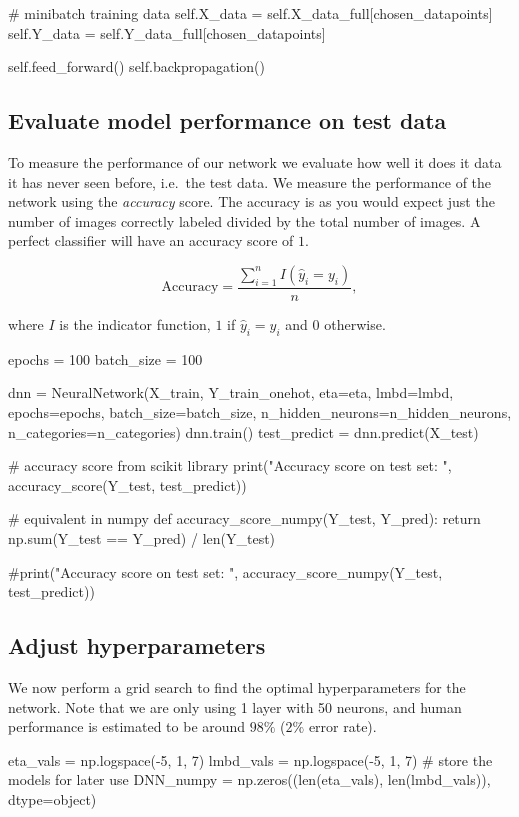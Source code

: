 \documentclass[%
oneside,                 %
final,                   %
10pt]{article}
\begin{document}
                # minibatch training data
                self.X_data = self.X_data_full[chosen_datapoints]
                self.Y_data = self.Y_data_full[chosen_datapoints]

                self.feed_forward()
                self.backpropagation()
\epycod

\subsection{Evaluate model performance on test data}

To measure the performance of our network we evaluate how well it does it data it has never seen before, i.e.~the test data.  
We measure the performance of the network using the \emph{accuracy} score.  
The accuracy is as you would expect just the number of images correctly labeled divided by the total number of images. A perfect classifier will have an accuracy score of $1$.  

$$ \text{Accuracy} = \frac{\sum_{i=1}^n I(\hat{y}_i = y_i)}{n} ,$$  

where $I$ is the indicator function, $1$ if $\hat{y}_i = y_i$ and $0$ otherwise.


\bpycod
epochs = 100
batch_size = 100

dnn = NeuralNetwork(X_train, Y_train_onehot, eta=eta, lmbd=lmbd, epochs=epochs, batch_size=batch_size,
                    n_hidden_neurons=n_hidden_neurons, n_categories=n_categories)
dnn.train()
test_predict = dnn.predict(X_test)

# accuracy score from scikit library
print("Accuracy score on test set: ", accuracy_score(Y_test, test_predict))

# equivalent in numpy
def accuracy_score_numpy(Y_test, Y_pred):
    return np.sum(Y_test == Y_pred) / len(Y_test)

#print("Accuracy score on test set: ", accuracy_score_numpy(Y_test, test_predict))
\epycod

\subsection{Adjust hyperparameters}

We now perform a grid search to find the optimal hyperparameters for the network.  
Note that we are only using 1 layer with 50 neurons, and human performance is estimated to be around $98\%$ ($2\%$ error rate).

\bpycod
eta_vals = np.logspace(-5, 1, 7)
lmbd_vals = np.logspace(-5, 1, 7)
# store the models for later use
DNN_numpy = np.zeros((len(eta_vals), len(lmbd_vals)), dtype=object)
\end{document}
